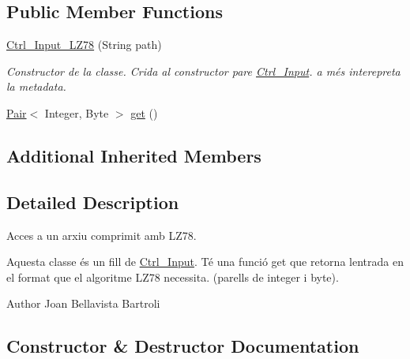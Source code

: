 \subsection*{Public Member Functions}
\begin{DoxyCompactItemize}
\item 
\hyperlink{classpersistencia_1_1input_1_1Ctrl__Input__LZ78_a3629302a8c1eb2b0c7367ad0ea542780}{Ctrl\+\_\+\+Input\+\_\+\+L\+Z78} (String path)
\begin{DoxyCompactList}\small\item\em Constructor de la classe. Crida al constructor pare \hyperlink{classpersistencia_1_1input_1_1Ctrl__Input}{Ctrl\+\_\+\+Input}. a més interepreta la metadata. \end{DoxyCompactList}\item 
\hyperlink{classdomini_1_1utils_1_1Pair}{Pair}$<$ Integer, Byte $>$ \hyperlink{classpersistencia_1_1input_1_1Ctrl__Input__LZ78_ae09535962f284be3a76369845c15b78c}{get} ()
\end{DoxyCompactItemize}
\subsection*{Additional Inherited Members}


\subsection{Detailed Description}
Acces a un arxiu comprimit amb L\+Z78. 

Aquesta classe és un fill de \hyperlink{classpersistencia_1_1input_1_1Ctrl__Input}{Ctrl\+\_\+\+Input}. Té una funció get que retorna l\textquotesingle{}entrada en el format que el algoritme L\+Z78 necessita. (parells de integer i byte).

\begin{DoxyAuthor}{Author}
Joan Bellavista Bartroli 
\end{DoxyAuthor}


\subsection{Constructor \& Destructor Documentation}
\mbox{\label{classpersistencia_1_1input_1_1Ctrl__Input__LZ78_a3629302a8c1eb2b0c7367ad0ea542780}} 
